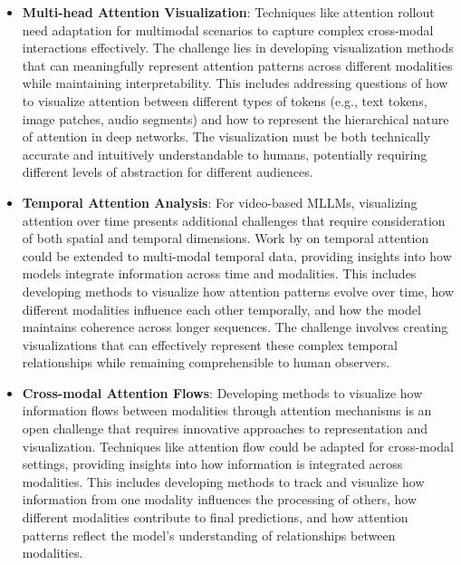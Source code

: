 \begin{itemize}
    \item \textbf{Multi-head Attention Visualization}: Techniques like attention rollout \citep{abnar2020quantifying} need adaptation for multimodal scenarios to capture complex cross-modal interactions effectively. The challenge lies in developing visualization methods that can meaningfully represent attention patterns across different modalities while maintaining interpretability. This includes addressing questions of how to visualize attention between different types of tokens (e.g., text tokens, image patches, audio segments) and how to represent the hierarchical nature of attention in deep networks. The visualization must be both technically accurate and intuitively understandable to humans, potentially requiring different levels of abstraction for different audiences.
    
    \item \textbf{Temporal Attention Analysis}: For video-based MLLMs, visualizing attention over time presents additional challenges that require consideration of both spatial and temporal dimensions. Work by \citet{zhou2018end} on temporal attention could be extended to multi-modal temporal data, providing insights into how models integrate information across time and modalities. This includes developing methods to visualize how attention patterns evolve over time, how different modalities influence each other temporally, and how the model maintains coherence across longer sequences. The challenge involves creating visualizations that can effectively represent these complex temporal relationships while remaining comprehensible to human observers.
    
    \item \textbf{Cross-modal Attention Flows}: Developing methods to visualize how information flows between modalities through attention mechanisms is an open challenge that requires innovative approaches to representation and visualization. Techniques like attention flow \citep{abnar2020quantifying} could be adapted for cross-modal settings, providing insights into how information is integrated across modalities. This includes developing methods to track and visualize how information from one modality influences the processing of others, how different modalities contribute to final predictions, and how attention patterns reflect the model's understanding of relationships between modalities.
\end{itemize}

